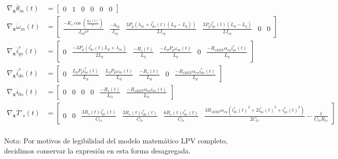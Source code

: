 \documentclass[a4paper, 10pt, onecolumn,journal]{ieeeconf}
\begin{document}
\begin{equation}
    \begin{aligned}
        \nabla_{\mathbf{x}} \dot{\theta}_m(t) &= \begin{bmatrix} 0 & 1 & 0 & 0 & 0 & 0 \end{bmatrix}\\
        \nabla_{\mathbf{x}} \dot{\omega}_m(t) &= \begin{bmatrix}
        \frac{-K_{l} \cos\left(\frac{\theta_m(t)}{r}\right)}{J_{eq} r^2} & \frac{-b_{eq}}{J_{eq}} & \frac{3 P_p \left(\lambda_m+i^r_{ds}(t) \left(L_d-L_q\right)\right)}{2 J_{eq}} & \frac{3 P_p i^r_{qs}(t) \left(L_d-L_q\right)}{2 J_{eq}} & 0 & 0 
        \end{bmatrix}\\
        \nabla_{\mathbf{x}} \dot{i}^r_{qs}(t) &= \begin{bmatrix} 
        0 & \frac{-3 P_p \left(i^r_{ds}(t) L_d+\lambda_m\right)}{2 L_q} & \frac{-R_s(t)}{L_q} & \frac{-L_d P_p \omega_m(t)}{L_q} & 0 & \frac{-R_{sREF} \alpha_{cu} i^r_{qs}(t)}{L_q} 
        \end{bmatrix}\\
        \nabla_{\mathbf{x}} \dot{i}^r_{ds}(t) &= \begin{bmatrix} 
        0 & \frac{L_q P_p i^r_{qs}(t)}{L_d} & \frac{L_q P_p \omega_m(t)}{L_d} & \frac{-R_s(t)}{L_d} & 0 & \frac{-R_{sREF} \alpha_{cu} i^r_{ds}(t)}{L_d} 
        \end{bmatrix}\\
        \nabla_{\mathbf{x}} \dot{i}_{0s}(t) &= \begin{bmatrix} 
        0 & 0 & 0 & 0 & \frac{-R_s(t)}{L_{ls}} & \frac{-R_{sREF} \alpha_{cu} i_{0s}(t)}{L_{ls}} 
        \end{bmatrix}\\
        \nabla_{\mathbf{x}} \dot{T^\circ}_s(t) &= \begin{bmatrix} 
        0 & 0 & \frac{3 R_s(t) i^r_{qs}(t)}{C_{ts}} & \frac{3 R_s(t) i^r_{ds}(t)}{C_{ts}} & \frac{6 R_s(t) i^r_{0s}(t)}{C_{ts}} & \frac{3 R_{sREF} \alpha_{cu} \left({i^r_{ds}(t)}^2+2 {i^r_{0s}(t)}^2+{i^r_{qs}(t)}^2\right)}{2 C_{ts}} - \frac{1}{C_{ts} R_{ts}} 
        \end{bmatrix}\\
    \end{aligned}
    \label{gradientesA}
\end{equation}

Nota: Por motivos de legibilidad del modelo matemático LPV completo, decidimos conservar la expresión en esta forma desagregada.
\end{document}
